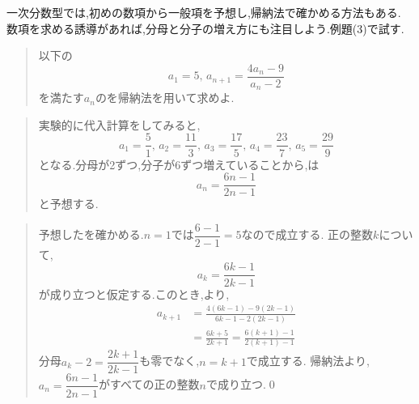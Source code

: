   一次分数型では,初めの数項から一般項を予想し,帰納法で確かめる方法もある.
  数項を求める誘導があれば,分母と分子の増え方にも注目しよう.例題(3)で試す.\\
    \noindent{}\par\nobreak
    \begin{quote}
      以下の
      \[
        a_1=5,\, a_{n+1}=\dfrac{4a_{n}-9}{a_{n}-2}
      \]
      を満たす$a_n$のを帰納法を用いて求めよ.
    \end{quote}
    \begin{quote}
      実験的に代入計算をしてみると,
      \[
        a_1=\frac{5}{1},\,a_2=\frac{11}{3},\,a_3=\frac{17}{5},\,a_4=\frac{23}{7},\,a_5=\frac{29}{9}
      \]
      となる.分母が2ずつ,分子が6ずつ増えていることから,は
      \[
        a_n=\frac{6n-1}{2n-1}
      \]
      と予想する.
    \end{quote}
    \begin{quote}
      予想したを確かめる.$n=1$では$\dfrac{6-1}{2-1}=5$なので成立する.
      正の整数$k$について,
      \[
        a_k=\frac{6k-1}{2k-1}
      \]
      が成り立つと仮定する.このとき,より,
      \begin{align*}
        a_{k+1}&=\frac{4(6k-1)-9(2k-1)}{6k-1-2(2k-1)}\\
        &=\frac{6k+5}{2k+1}
          =\frac{6(k+1)-1}{2(k+1)-1}
      \end{align*}
      分母$a_k-2=\dfrac{2k+1}{2k-1}$も零でなく,$n=k+1$で成立する.
      帰納法より,$a_n=\dfrac{6n-1}{2n-1}$がすべての正の整数$n$で成り立つ.\qed

  \end{quote}
